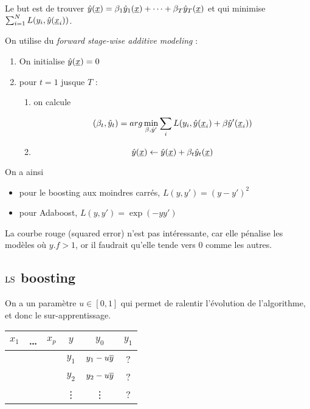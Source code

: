 	Le but est de trouver $\hat{y}(\underline{x}) = \beta_1 \hat{y}_1(\underline{x}) + \dots + \beta_T \hat{y}_T(\underline{x})$ et qui minimise $\sum_{i = 1}^N L(y_i, \hat{y}(\underline{x}_i))$.
	
	On utilise du \textit{forward stage-wise additive modeling} :
	
	\begin{enumerate}
		\item On initialise $\hat{y}(\underline{x}) = 0$
		\item pour $t = 1$ jusque $T$ :
		
		\begin{enumerate}
			\item on calcule
			
			$$(\beta_t, \hat{y}_t) = arg \min_{\beta, \hat{y}'} \sum_i L(y_i, \hat{y}(\underline{x}_i) + \beta \hat{y}'(\underline{x}_i))$$
			\item 
			
			$$\hat{y}(\underline{x}) \leftarrow \hat{y}(\underline{x}) + \beta_t \hat{y}_t(\underline{x})$$
		\end{enumerate}
	\end{enumerate}
	
	On a ainsi
	
	\begin{itemize}
		\item pour le boosting aux moindres carrés, $L(y, y') = (y - y')^2$
		\item pour Adaboost, $L(y, y') = \exp{(-y y')}$
	\end{itemize}
	
	
	La courbe rouge (squared error) n'est pas intéressante, car elle pénalise les modèles où $y.f > 1$, or il faudrait qu'elle tende vers 0 comme les autres.
	
	\subsection{$\text{LS}$ boosting}

		
	On a un paramètre $u \in [0, 1]$ qui permet de ralentir l'évolution de l'algorithme, et donc le sur-apprentissage.
	
	\begin{center}
	\begin{tabular}{ccc|ccc}
	$x_1$ & \dots & $x_p$ & $y$ & $y_0$ & $y_1$ \\ 
	\hline 
	  &   &   & $y_1$ & $y_1 - u\overline{y}$ & ? \\ 
	  &   &   & $y_2$ & $y_2 - u\overline{y}$ & ? \\ 
	  &   &  & \vdots & \vdots & ? \\ 
	\end{tabular} 
	\end{center}
	
